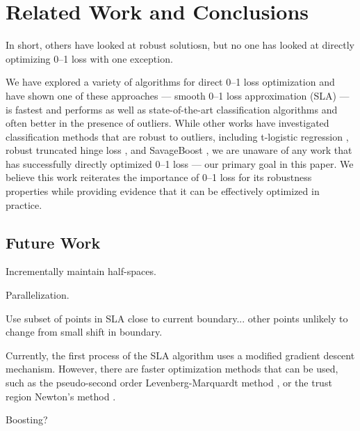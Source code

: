 \section{Related Work and Conclusions}
\label{cha:conclusions}

\COMMENT
In short, others have looked at robust solutiosn, but no one
has looked at directly optimizing 0--1 loss with one
exception.
\ENDCOMMENT

We have explored a variety of algorithms for direct 0--1 loss
optimization and have shown one of these approaches --- smooth
0--1 loss approximation (SLA) --- is fastest and performs as well as
state-of-the-art classification algorithms and often better in the
presence of outliers.  While other works have investigated
classification methods that are robust to outliers, including
t-logistic regression \cite{Ding}, robust truncated hinge loss
\cite{wu07}, and SavageBoost \cite{lossdesign}, we are unaware of any
work that has successfully directly optimized 0--1 loss --- our
primary goal in this paper.  We believe this work reiterates the
importance of 0--1 loss for its robustness properties while providing
evidence that it can be effectively optimized in practice.

\COMMENT

\subsection{Future Work}
\label{sec:concl.futurework}

Incrementally maintain half-spaces.

Parallelization.

Use subset of points in SLA close to current boundary... other
points unlikely to change from small shift in boundary.

Currently, the first process of the SLA algorithm uses a modified
gradient descent mechanism. However, there are faster optimization
methods that can be used, such as the pseudo-second order
Levenberg-Marquardt method \cite{Marquardt}, or the trust region
Newton's method \cite{Steihaug}.

Boosting?

\ENDCOMMENT
